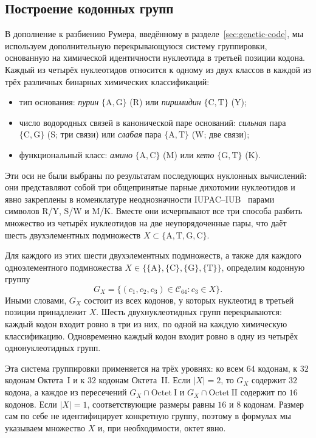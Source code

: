 \documentclass[11pt,a4paper]{article}
\renewcommand{\_}{\origunderscore\allowbreak}
\begin{document}
\subsection{Построение кодонных групп}
\label{sec:partitioning}

В дополнение к разбиению Румера, введённому в
разделе~\ref{sec:genetic-code}, мы используем дополнительную
перекрывающуюся систему группировки, основанную на химической
идентичности нуклеотида в третьей позиции кодона. Каждый из четырёх
нуклеотидов относится к одному из двух классов в каждой из трёх
различных бинарных химических классификаций:
\begin{itemize}
  \item тип основания: \emph{пурин}
        $\{\mathrm{A},\mathrm{G}\}$ (R) или \emph{пиримидин}
        $\{\mathrm{C},\mathrm{T}\}$ (Y);
  \item число водородных связей в канонической паре оснований:
        \emph{сильная} пара $\{\mathrm{C},\mathrm{G}\}$ (S; три
        связи) или \emph{слабая} пара
        $\{\mathrm{A},\mathrm{T}\}$ (W; две связи);
  \item функциональный класс: \emph{амино}
        $\{\mathrm{A},\mathrm{C}\}$ (M) или \emph{кето}
        $\{\mathrm{G},\mathrm{T}\}$ (K).
\end{itemize}
Эти оси не были выбраны по результатам последующих нуклонных
вычислений: они представляют собой три общепринятые парные
дихотомии нуклеотидов и явно закреплены в номенклатуре
неоднозначности IUPAC--IUB~\cite{cornishbowden1985} парами символов
R/Y, S/W и M/K. Вместе они исчерпывают все три способа
разбить множество из четырёх нуклеотидов на две
неупорядоченные пары, что даёт шесть двухэлементных
подмножеств
$X \subset \{\mathrm{A}, \mathrm{T}, \mathrm{G}, \mathrm{C}\}$.

Для каждого из этих шести двухэлементных подмножеств, а также для
каждого одноэлементного подмножества
$X\in\{\{\mathrm{A}\},\{\mathrm{C}\},\{\mathrm{G}\},
\{\mathrm{T}\}\}$, определим кодонную группу
\[
G_X =
\{(c_1,c_2,c_3)\in\mathcal{C}_{64}
  : c_3\in X\}.
\]
Иными словами, $G_X$ состоит из всех кодонов, у которых нуклеотид
в третьей позиции принадлежит $X$. Шесть двухнуклеотидных групп
перекрываются: каждый кодон входит ровно в три из них, по одной на
каждую химическую классификацию. Одновременно каждый кодон входит
ровно в одну из четырёх однонуклеотидных групп.

Эта система группировки применяется на трёх уровнях: ко всем
$64$ кодонам, к $32$ кодонам Октета~I и к $32$ кодонам
Октета~II. Если $|X|=2$, то $G_X$ содержит $32$ кодона, а каждое
из пересечений $G_X\cap\mathrm{Octet~I}$ и
$G_X\cap\mathrm{Octet~II}$ содержит по $16$ кодонов. Если
$|X|=1$, соответствующие размеры равны $16$ и $8$ кодонам.
Размер сам по себе не идентифицирует конкретную группу, поэтому
в формулах мы указываем множество $X$ и, при необходимости,
октет явно.
\end{document}
